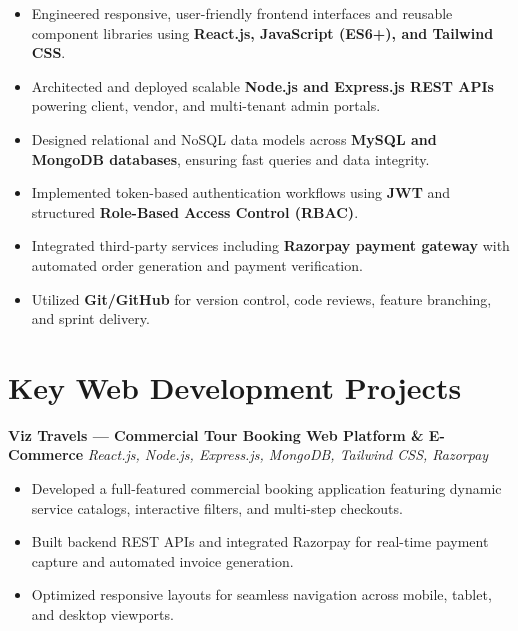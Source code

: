 \documentclass[a4paper,10pt]{article}
\begin{document}
\begin{itemize}

    \item Engineered responsive, user-friendly frontend interfaces and reusable component libraries using \textbf{React.js, JavaScript (ES6+), and Tailwind CSS}.

    \item Architected and deployed scalable \textbf{Node.js and Express.js REST APIs} powering client, vendor, and multi-tenant admin portals.

    \item Designed relational and NoSQL data models across \textbf{MySQL and MongoDB databases}, ensuring fast queries and data integrity.

    \item Implemented token-based authentication workflows using \textbf{JWT} and structured \textbf{Role-Based Access Control (RBAC)}.

    \item Integrated third-party services including \textbf{Razorpay payment gateway} with automated order generation and payment verification.

    \item Utilized \textbf{Git/GitHub} for version control, code reviews, feature branching, and sprint delivery.

\end{itemize}

\section*{Key Web Development Projects}

\textbf{Viz Travels --- Commercial Tour Booking Web Platform \& E-Commerce}
\hfill
\textit{React.js, Node.js, Express.js, MongoDB, Tailwind CSS, Razorpay}

\begin{itemize}

    \item Developed a full-featured commercial booking application featuring dynamic service catalogs, interactive filters, and multi-step checkouts.

    \item Built backend REST APIs and integrated Razorpay for real-time payment capture and automated invoice generation.

    \item Optimized responsive layouts for seamless navigation across mobile, tablet, and desktop viewports.

\end{itemize}
\end{document}
